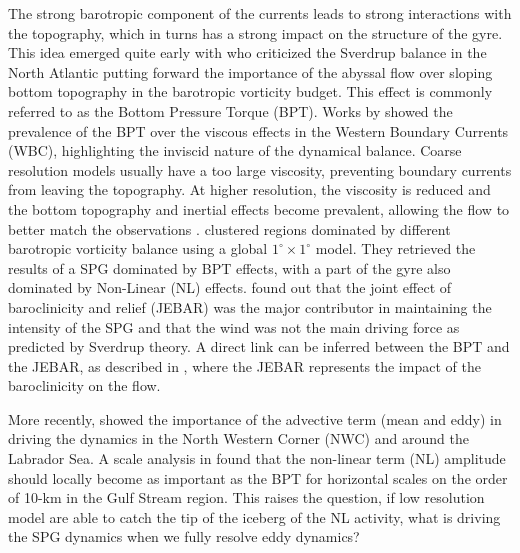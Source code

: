 \documentclass[11pt,a4paper]{article}
\begin{document}
The strong barotropic component of the currents leads to strong interactions with the topography, which in turns has a strong impact on the structure of the gyre. This idea emerged quite early with \citet{luyten1985, wunsch1985} who criticized the Sverdrup balance in the North Atlantic putting forward the importance of the abyssal flow over sloping bottom topography in the barotropic vorticity budget. This effect is commonly referred to as the Bottom Pressure Torque (BPT). Works by \citet{hughes2000,hughes2001, jackson2006} showed the prevalence of the BPT over the viscous effects in the Western Boundary Currents (WBC), highlighting the inviscid nature of the dynamical balance. Coarse resolution models usually have a too large viscosity, preventing boundary currents from leaving the topography. At higher resolution, the viscosity is reduced and the bottom topography and inertial effects become prevalent, allowing the flow to better match the observations \citep{spence2012, schoonover2016}. \citet{sonnewald2019} clustered regions dominated by different barotropic vorticity balance using a global $1^{\circ} \times 1^{\circ}$ model. They retrieved the results of a SPG dominated by BPT effects, with a part of the gyre also dominated by Non-Linear (NL) effects. \citet{greatbatch1991} found out that the joint effect of baroclinicity and relief (JEBAR) \citep{mellor, mertz1992} was the major contributor in maintaining the intensity of the SPG and that the wind was not the main driving force as predicted by Sverdrup theory. A direct link can be inferred between the BPT and the JEBAR, as described in \citet{yeager2015}, where the JEBAR represents the impact of the baroclinicity on the flow. 

More recently, \citet{wang2017} showed the importance of the advective term (mean and eddy) in driving the dynamics in the North Western Corner (NWC) and around the Labrador Sea. A scale analysis in \citet{schoonover2016} found that the non-linear term (NL) amplitude should locally become as important as the BPT for horizontal scales on the order of 10-km in the Gulf Stream region. This raises the question, if low resolution model are able to catch the tip of the iceberg of the NL activity, what is driving the SPG dynamics when we fully resolve  eddy dynamics?
\end{document}
